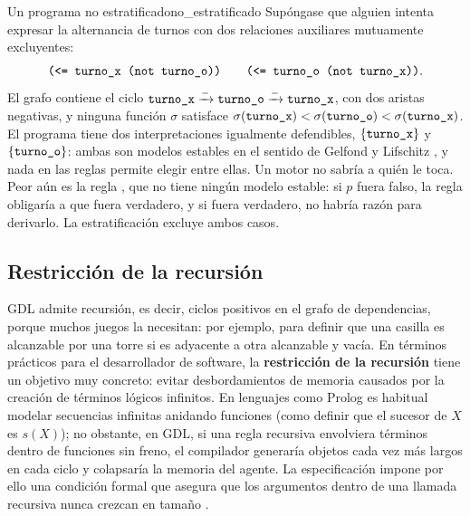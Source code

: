 \begin{ejemplo}{Un programa no estratificado}{no_estratificado}
Supóngase que alguien intenta expresar la alternancia de turnos con dos relaciones auxiliares mutuamente excluyentes:
\begin{equation*}
    \texttt{(<= turno\_x (not turno\_o))} \qquad \texttt{(<= turno\_o (not turno\_x))} .
\end{equation*}
El grafo contiene el ciclo $\texttt{turno\_x} \xrightarrow{-} \texttt{turno\_o} \xrightarrow{-} \texttt{turno\_x}$, con dos aristas negativas, y ninguna función $\sigma$ satisface $\sigma(\texttt{turno\_x}) < \sigma(\texttt{turno\_o}) < \sigma(\texttt{turno\_x})$. El programa tiene dos interpretaciones igualmente defendibles, $\{\texttt{turno\_x}\}$ y $\{\texttt{turno\_o}\}$: ambas son modelos estables en el sentido de Gelfond y Lifschitz \cite{GelfondLifschitz1988}, y nada en las reglas permite elegir entre ellas. Un motor no sabría a quién le toca. Peor aún es la regla , que no tiene ningún modelo estable: si $p$ fuera falso, la regla obligaría a que fuera verdadero, y si fuera verdadero, no habría razón para derivarlo. La estratificación excluye ambos casos.
\end{ejemplo}

\subsection{Restricción de la recursión}

GDL admite recursión, es decir, ciclos positivos en el grafo de dependencias, porque muchos juegos la necesitan: por ejemplo, para definir que una casilla es alcanzable por una torre si es adyacente a otra alcanzable y vacía. En términos prácticos para el desarrollador de software, la \textbf{restricción de la recursión} tiene un objetivo muy concreto: evitar desbordamientos de memoria causados por la creación de términos lógicos infinitos. En lenguajes como Prolog es habitual modelar secuencias infinitas anidando funciones (como definir que el sucesor de $X$ es $s(X)$); no obstante, en GDL, si una regla recursiva envolviera términos dentro de funciones sin freno, el compilador generaría objetos cada vez más largos en cada ciclo y colapsaría la memoria del agente. La especificación impone por ello una condición formal que asegura que los argumentos dentro de una llamada recursiva nunca crezcan en tamaño \cite{Love2008GDL}.


